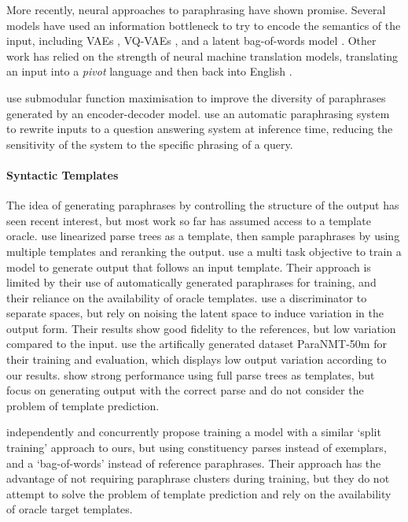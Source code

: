 \documentclass[11pt,a4paper]{article}
\begin{document}
More recently, neural approaches to paraphrasing have shown
promise. Several models have used an information bottleneck to try to
encode the semantics of the input, including VAEs
\cite{bowman-etal-2016-generating}, VQ-VAEs
\cite{vqvae,roy-grangier-2019-unsupervised}, and a latent bag-of-words
model \cite{latentbow}. Other work has relied on the strength of
neural machine translation models, translating an input into a
\textit{pivot} language and then back into English
\cite{mallinson-etal-2017-paraphrasing,wieting-gimpel-2018-paranmt,parabank}.

\citet{kumar-etal-2019-submodular} use submodular function maximisation to improve the diversity of paraphrases generated by an encoder-decoder model. \citet{dong-etal-2017-learning-paraphrase} use an automatic paraphrasing system to rewrite inputs to a question answering system at inference time, reducing the sensitivity of the system to the specific phrasing of a query.



\paragraph{Syntactic Templates}

The idea of generating paraphrases by controlling the structure of the output has seen recent interest, but most work so far has assumed access to a template oracle. \citet{iyyer-etal-2018-adversarial} use linearized parse trees as a template, then sample paraphrases by using multiple templates and reranking the output. \citet{chen-etal-2019-controllable} use a multi task objective to train a model to generate output that follows an input template. Their approach is limited by their use of automatically generated paraphrases for training, and their reliance on the availability of oracle templates. \citet{bao-etal-2019-generating} use a discriminator to separate spaces, but rely on noising the latent space to induce variation in the output form. Their results show good fidelity to the references, but low variation compared to the input. \citet{goyal_neural_2020} use the artifically generated dataset ParaNMT-50m \cite{wieting-gimpel-2018-paranmt} for their training and evaluation, which displays low output variation according to our results. \citet{sgcp2020} show strong performance using full parse trees as templates, but focus on generating output with the correct parse and do not consider the problem of template prediction.

\citet{synpg} independently and concurrently propose training a model with a similar `split training' approach to ours, but using constituency parses instead of exemplars, and a `bag-of-words' instead of reference paraphrases. Their approach has the advantage of not requiring paraphrase clusters during training, but they do not attempt to solve the problem of template prediction and rely on the availability of oracle target templates.
\end{document}
